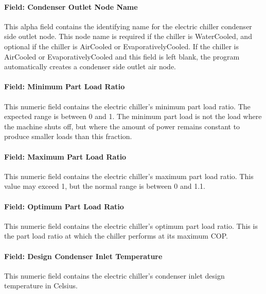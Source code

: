 \paragraph{Field: Condenser Outlet Node Name}\label{field-condenser-outlet-node-name-3}

This alpha field contains the identifying name for the electric chiller condenser side outlet node. This node name is required if the chiller is WaterCooled, and optional if the chiller is AirCooled or EvaporativelyCooled. If the chiller is AirCooled or EvaporativelyCooled and this field is left blank, the program automatically creates a condenser side outlet air node.

\paragraph{Field: Minimum Part Load Ratio}\label{field-minimum-part-load-ratio-2}

This numeric field contains the electric chiller's minimum part load ratio. The expected range is between 0 and 1. The minimum part load is not the load where the machine shuts off, but where the amount of power remains constant to produce smaller loads than this fraction.

\paragraph{Field: Maximum Part Load Ratio}\label{field-maximum-part-load-ratio-2}

This numeric field contains the electric chiller's maximum part load ratio. This value may exceed 1, but the normal range is between 0 and 1.1.

\paragraph{Field: Optimum Part Load Ratio}\label{field-optimum-part-load-ratio-2}

This numeric field contains the electric chiller's optimum part load ratio. This is the part load ratio at which the chiller performs at its maximum COP.

\paragraph{Field: Design Condenser Inlet Temperature}\label{field-design-condenser-inlet-temperature-2}

This numeric field contains the electric chiller's condenser inlet design temperature in Celsius.

